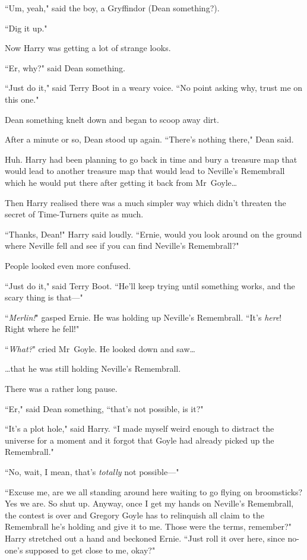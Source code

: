 ``Um, yeah," said the boy, a Gryffindor (Dean something?).

``Dig it up."

Now Harry was getting a lot of strange looks.

``Er, why?" said Dean something.

``Just do it," said Terry Boot in a weary voice. ``No point asking why, trust me on this one."

Dean something knelt down and began to scoop away dirt.

After a minute or so, Dean stood up again. ``There's nothing there," Dean said.

Huh. Harry had been planning to go back in time and bury a treasure map that would lead to another treasure map that would lead to Neville's Remembrall which he would put there after getting it back from Mr~Goyle…

Then Harry realised there was a much simpler way which didn't threaten the secret of Time-Turners quite as much.

``Thanks, Dean!" Harry said loudly. ``Ernie, would you look around on the ground where Neville fell and see if you can find Neville's Remembrall?"

People looked even more confused.

``Just do it," said Terry Boot. ``He'll keep trying until something works, and the scary thing is that—"

``\emph{Merlin!}" gasped Ernie. He was holding up Neville's Remembrall. ``It's \emph{here}! Right where he fell!"

``\emph{What?}" cried Mr~Goyle. He looked down and saw…

…that he was still holding Neville's Remembrall.

There was a rather long pause.

``Er," said Dean something, ``that's not possible, is it?"

``It's a plot hole," said Harry. ``I made myself weird enough to distract the universe for a moment and it forgot that Goyle had already picked up the Remembrall."

``No, wait, I mean, that's \emph{totally} not possible—"

``Excuse me, are we all standing around here waiting to go flying on broomsticks? Yes we are. So shut up. Anyway, once I get my hands on Neville's Remembrall, the contest is over and Gregory Goyle has to relinquish all claim to the Remembrall he's holding and give it to me. Those were the terms, remember?" Harry stretched out a hand and beckoned Ernie. ``Just roll it over here, since no-one's supposed to get close to me, okay?"

